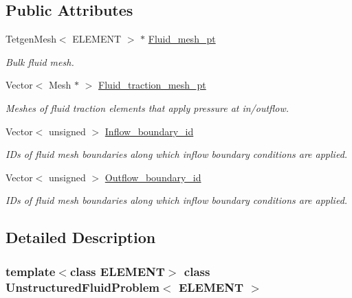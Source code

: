 \subsection*{Public Attributes}
\begin{DoxyCompactItemize}
\item 
Tetgen\+Mesh$<$ E\+L\+E\+M\+E\+NT $>$ $\ast$ \hyperlink{classUnstructuredFluidProblem_ade90cb92dd49b9d897ed538b1876b060}{Fluid\+\_\+mesh\+\_\+pt}
\begin{DoxyCompactList}\small\item\em Bulk fluid mesh. \end{DoxyCompactList}\item 
Vector$<$ Mesh $\ast$ $>$ \hyperlink{classUnstructuredFluidProblem_ad2fd96c077dbc69077daaf20a314896c}{Fluid\+\_\+traction\+\_\+mesh\+\_\+pt}
\begin{DoxyCompactList}\small\item\em Meshes of fluid traction elements that apply pressure at in/outflow. \end{DoxyCompactList}\item 
Vector$<$ unsigned $>$ \hyperlink{classUnstructuredFluidProblem_a2923e009bcea7cdbdd7ea5788580a3f8}{Inflow\+\_\+boundary\+\_\+id}
\begin{DoxyCompactList}\small\item\em I\+Ds of fluid mesh boundaries along which inflow boundary conditions are applied. \end{DoxyCompactList}\item 
Vector$<$ unsigned $>$ \hyperlink{classUnstructuredFluidProblem_a9bace139103152045dfe88e3d0163811}{Outflow\+\_\+boundary\+\_\+id}
\begin{DoxyCompactList}\small\item\em I\+Ds of fluid mesh boundaries along which inflow boundary conditions are applied. \end{DoxyCompactList}\end{DoxyCompactItemize}


\subsection{Detailed Description}
\subsubsection*{template$<$class E\+L\+E\+M\+E\+NT$>$\newline
class Unstructured\+Fluid\+Problem$<$ E\+L\+E\+M\+E\+N\+T $>$}

